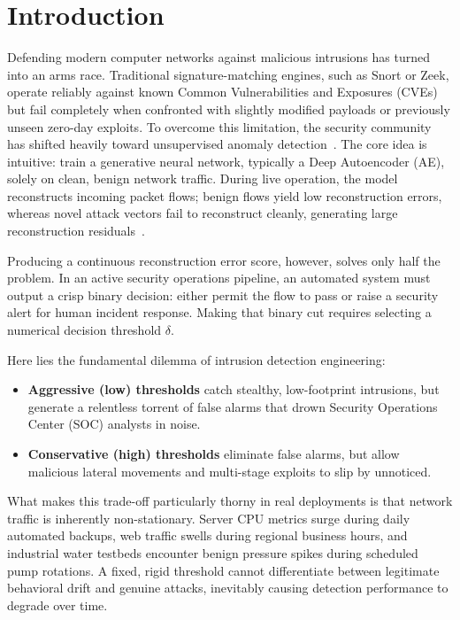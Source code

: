 \documentclass[conference]{IEEEtran}
\begin{document}
\section{Introduction}
Defending modern computer networks against malicious intrusions has turned into an arms race. Traditional signature-matching engines, such as Snort or Zeek, operate reliably against known Common Vulnerabilities and Exposures (CVEs) but fail completely when confronted with slightly modified payloads or previously unseen zero-day exploits. To overcome this limitation, the security community has shifted heavily toward unsupervised anomaly detection~\cite{pang2021deep}. The core idea is intuitive: train a generative neural network, typically a Deep Autoencoder (AE), solely on clean, benign network traffic. During live operation, the model reconstructs incoming packet flows; benign flows yield low reconstruction errors, whereas novel attack vectors fail to reconstruct cleanly, generating large reconstruction residuals~\cite{mirsky2018kitsune}.

Producing a continuous reconstruction error score, however, solves only half the problem. In an active security operations pipeline, an automated system must output a crisp binary decision: either permit the flow to pass or raise a security alert for human incident response. Making that binary cut requires selecting a numerical decision threshold $\delta$.

Here lies the fundamental dilemma of intrusion detection engineering:
\begin{itemize}
    \item \textbf{Aggressive (low) thresholds} catch stealthy, low-footprint intrusions, but generate a relentless torrent of false alarms that drown Security Operations Center (SOC) analysts in noise.
    \item \textbf{Conservative (high) thresholds} eliminate false alarms, but allow malicious lateral movements and multi-stage exploits to slip by unnoticed.
\end{itemize}

What makes this trade-off particularly thorny in real deployments is that network traffic is inherently non-stationary. Server CPU metrics surge during daily automated backups, web traffic swells during regional business hours, and industrial water testbeds encounter benign pressure spikes during scheduled pump rotations. A fixed, rigid threshold cannot differentiate between legitimate behavioral drift and genuine attacks, inevitably causing detection performance to degrade over time.
\end{document}
